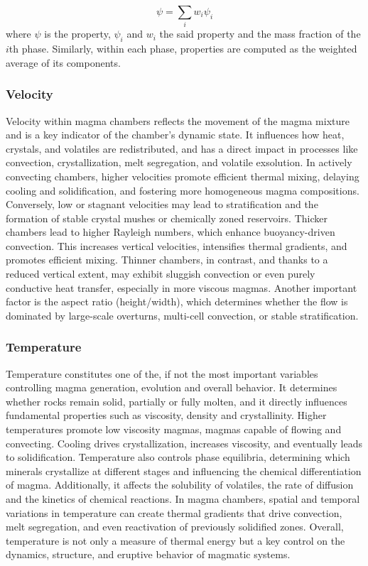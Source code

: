 \begin{equation}
	\psi = \sum_i w_i\psi_i
\end{equation}
where $\psi$ is the property, $\psi_i$ and $w_i$ the said property and the mass fraction of the $i$th phase. Similarly, within each phase, properties are computed as the weighted average of its components.
\subsubsection{Velocity}
Velocity within magma chambers reflects the movement of the magma mixture and is a key indicator of the chamber’s dynamic state. It influences how heat, crystals, and volatiles are redistributed, and has a direct impact in processes like convection, crystallization, melt segregation, and volatile exsolution. In actively convecting chambers, higher velocities promote efficient thermal mixing, delaying cooling and solidification, and fostering more homogeneous magma compositions. Conversely, low or stagnant velocities may lead to stratification and the formation of stable crystal mushes or chemically zoned reservoirs.
Thicker chambers lead to higher Rayleigh numbers, which enhance buoyancy-driven convection. This increases vertical velocities, intensifies thermal gradients, and promotes efficient mixing. Thinner chambers, in contrast, and thanks to a reduced vertical extent, may exhibit sluggish convection or even purely conductive heat transfer, especially in more viscous magmas. Another important factor is the aspect ratio (height/width), which determines whether the flow is dominated by large-scale overturns, multi-cell convection, or stable stratification. %

\subsubsection{Temperature}
Temperature constitutes one of the, if not the most important variables controlling magma generation, evolution and overall behavior. It determines whether rocks remain solid, partially or fully molten, and it directly influences fundamental properties such as viscosity, density and crystallinity. Higher temperatures promote low viscosity magmas, magmas capable of flowing and convecting. Cooling drives crystallization, increases viscosity, and eventually leads to solidification. Temperature also controls phase equilibria, determining which minerals crystallize at different stages and influencing the chemical differentiation of magma. Additionally, it affects the solubility of volatiles, the rate of diffusion and the kinetics of chemical reactions. In magma chambers, spatial and temporal variations in temperature can create thermal gradients that drive convection, melt segregation, and even reactivation of previously solidified zones. Overall, temperature is not only a measure of thermal energy but a key control on the dynamics, structure, and eruptive behavior of magmatic systems.

